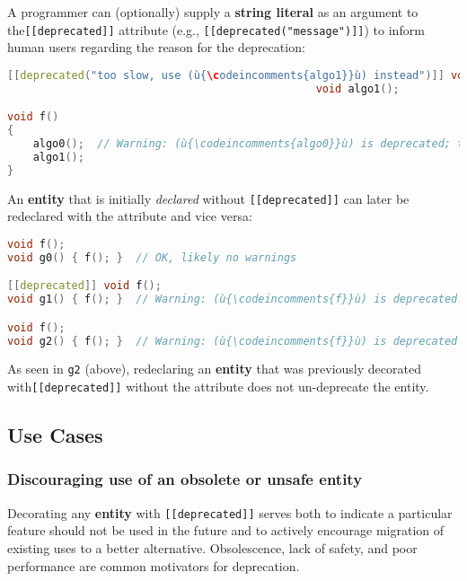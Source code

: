 \noindent A programmer can (optionally) supply a \textbf{string literal} as an
argument to the\linebreak[4] \mbox{\texttt{[[deprecated]]}} attribute (e.g.,
\mbox{\texttt{[[deprecated("message")]]}}) to inform human users regarding the
reason for the deprecation:

\begin{lstlisting}[language=C++]
[[deprecated("too slow, use (ù{\codeincomments{algo1}}ù) instead")]] void algo0();
                                                void algo1();

void f()
{
    algo0();  // Warning: (ù{\codeincomments{algo0}}ù) is deprecated; too slow, use (ù{\codeincomments{algo1}}ù) instead.
    algo1();
}
\end{lstlisting}
    
\noindent An \textbf{entity} that is initially \emph{declared} without
\texttt{[[deprecated]]} can later be redeclared with the attribute and
vice versa:

\begin{lstlisting}[language=C++]
void f();
void g0() { f(); }  // OK, likely no warnings

[[deprecated]] void f();
void g1() { f(); }  // Warning: (ù{\codeincomments{f}}ù) is deprecated.

void f();
void g2() { f(); }  // Warning: (ù{\codeincomments{f}}ù) is deprecated (still).
\end{lstlisting}
    
\noindent As seen in \texttt{g2} (above), redeclaring an \textbf{entity} that was
previously decorated with\linebreak[4] \mbox{\texttt{[[deprecated]]}} without the attribute
does not un-deprecate the entity.

\subsection[Use Cases]{Use Cases}\label{use-cases}

\subsubsection[Discouraging use of an obsolete or unsafe \textbf{entity}]{Discouraging use of an obsolete or unsafe \textbf{entity}}\label{discouraging-use-of-an-obsolete-or-unsafe-entity}

Decorating any \textbf{entity} with \texttt{[[deprecated]]} serves both
to indicate a particular feature should not be used in the future and
to actively encourage migration of existing uses to a better
alternative. Obsolescence, lack of safety, and poor performance are
common motivators for deprecation.

